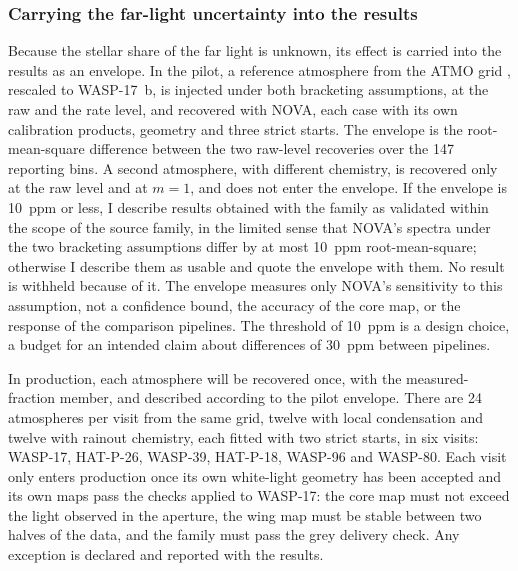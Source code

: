 \subsubsection{Carrying the far-light uncertainty into the results}
\label{sec:envelope}

Because the stellar share of the far light is unknown, its effect is carried
into the results as an envelope. In the pilot, a reference atmosphere from the
ATMO grid \citep{GoyalEtAl2019}, rescaled to WASP-17~b, is injected under
both bracketing assumptions, at the raw and the rate level, and recovered
with NOVA, each case with its own calibration products, geometry and three
strict starts. The envelope is the
root-mean-square difference between the two raw-level recoveries over the
147 reporting bins. A second atmosphere, with different chemistry, is
recovered only at the raw level and at $m=1$, and does not enter the
envelope. If the envelope is 10~ppm or less, I describe results obtained with
the family as validated within the scope of the source family, in the
limited sense that NOVA's spectra under the two bracketing assumptions differ
by at most 10~ppm root-mean-square; otherwise I describe them as usable and
quote the envelope with them. No result is withheld because of it. The
envelope measures only NOVA's sensitivity to this assumption, not a
confidence bound, the accuracy of the core map, or the response of the
comparison pipelines. The threshold of 10~ppm
is a design choice, a budget for an intended claim about differences of
30~ppm between pipelines.

In production, each atmosphere will be recovered once, with the
measured-fraction member, and described according to the pilot envelope.
There are 24 atmospheres per visit from the same grid, twelve with local
condensation and twelve with rainout chemistry, each fitted with two strict
starts, in six visits: WASP-17, HAT-P-26, WASP-39, HAT-P-18, WASP-96 and
WASP-80. Each visit only enters production once its own white-light geometry has
been accepted and its own maps pass the checks applied to WASP-17: the core
map must not exceed the light observed in the aperture, the wing map must be
stable between two halves of the data, and the family must pass the grey
delivery check. Any exception is declared and reported with the results.

